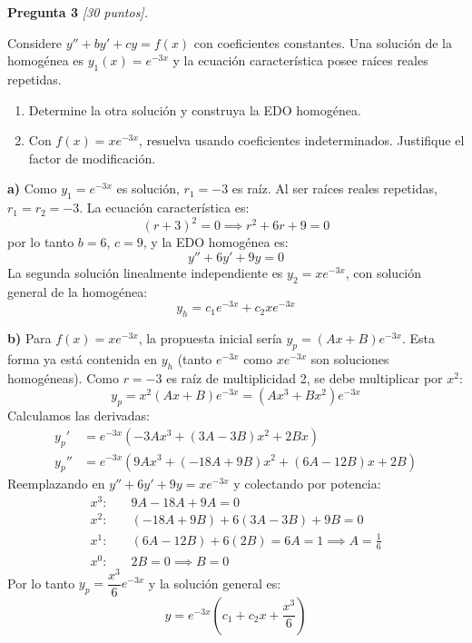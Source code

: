 \documentclass[12pt,letterpaper]{article}
\begin{document}
\textbf{Pregunta 3} \textit{[30 puntos].}

Considere $y''+by'+cy=f(x)$ con coeficientes constantes. Una solución de la homogénea
es $y_1(x)=e^{-3x}$ y la ecuación característica posee raíces reales repetidas.

\begin{enumerate}[label=\alph*)]
  \item Determine la otra solución y construya la EDO homogénea.
  \item Con $f(x)=xe^{-3x}$, resuelva usando coeficientes indeterminados.
        Justifique el factor de modificación.
\end{enumerate}

\medskip

\textbf{a)} Como $y_1=e^{-3x}$ es solución, $r_1=-3$ es raíz. Al ser raíces reales
repetidas, $r_1=r_2=-3$. La ecuación característica es:
\[
  (r+3)^2=0 \implies r^2+6r+9=0
\]
por lo tanto $b=6$, $c=9$, y la EDO homogénea es:
\[
  y''+6y'+9y=0
\]
La segunda solución linealmente independiente es $y_2=xe^{-3x}$, con solución
general de la homogénea:
\[
  y_h = c_1 e^{-3x} + c_2 x e^{-3x}
\]

\textbf{b)} Para $f(x)=xe^{-3x}$, la propuesta inicial sería $y_p=(Ax+B)e^{-3x}$.
Esta forma ya está contenida en $y_h$ (tanto $e^{-3x}$ como $xe^{-3x}$ son soluciones
homogéneas). Como $r=-3$ es raíz de multiplicidad 2, se debe multiplicar por $x^2$:
\[
  y_p = x^2(Ax+B)e^{-3x} = (Ax^3+Bx^2)e^{-3x}
\]
Calculamos las derivadas:
\begin{align*}
  y_p'  &= e^{-3x}\!\left(-3Ax^3+(3A-3B)x^2+2Bx\right) \\
  y_p'' &= e^{-3x}\!\left(9Ax^3+(-18A+9B)x^2+(6A-12B)x+2B\right)
\end{align*}
Reemplazando en $y''+6y'+9y=xe^{-3x}$ y colectando por potencia:
\begin{align*}
  x^3: &\quad 9A-18A+9A = 0 \\
  x^2: &\quad (-18A+9B)+6(3A-3B)+9B = 0 \\
  x^1: &\quad (6A-12B)+6(2B) = 6A = 1 \implies A=\tfrac{1}{6} \\
  x^0: &\quad 2B = 0 \implies B=0
\end{align*}
Por lo tanto $y_p=\dfrac{x^3}{6}e^{-3x}$ y la solución general es:
\[
  y = e^{-3x}\!\left(c_1 + c_2 x + \frac{x^3}{6}\right)
\]
\end{document}
